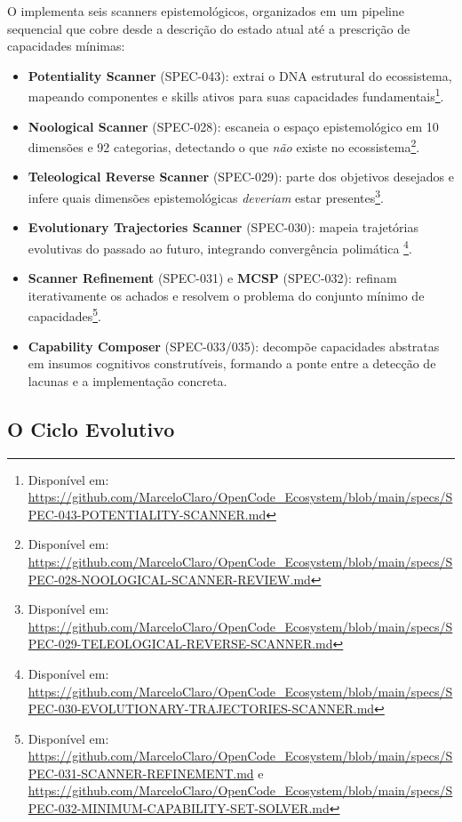 O \opencodeeco{} implementa seis scanners epistemológicos, organizados em um
pipeline sequencial que cobre desde a descrição do estado atual até a
prescrição de capacidades mínimas:

\begin{itemize}
\item \textbf{Potentiality Scanner} (SPEC-043): extrai o DNA estrutural do
ecossistema, mapeando componentes e skills ativos para suas capacidades
fundamentais\footnote{Disponível em:
\url{https://github.com/MarceloClaro/OpenCode_Ecosystem/blob/main/specs/SPEC-043-POTENTIALITY-SCANNER.md}}.
\item \textbf{Noological Scanner} (SPEC-028): escaneia o espaço epistemológico
em 10 dimensões e 92 categorias, detectando o que \emph{não} existe no
ecossistema\footnote{Disponível em:
\url{https://github.com/MarceloClaro/OpenCode_Ecosystem/blob/main/specs/SPEC-028-NOOLOGICAL-SCANNER-REVIEW.md}}.
\item \textbf{Teleological Reverse Scanner} (SPEC-029): parte dos objetivos
desejados e infere quais dimensões epistemológicas \emph{deveriam} estar
presentes\footnote{Disponível em:
\url{https://github.com/MarceloClaro/OpenCode_Ecosystem/blob/main/specs/SPEC-029-TELEOLOGICAL-REVERSE-SCANNER.md}}.
\item \textbf{Evolutionary Trajectories Scanner} (SPEC-030): mapeia trajetórias
evolutivas do passado ao futuro, integrando convergência polimática
\footnote{Disponível em:
\url{https://github.com/MarceloClaro/OpenCode_Ecosystem/blob/main/specs/SPEC-030-EVOLUTIONARY-TRAJECTORIES-SCANNER.md}}.
\item \textbf{Scanner Refinement} (SPEC-031) e \textbf{MCSP} (SPEC-032):
refinam iterativamente os achados e resolvem o problema do conjunto mínimo
de capacidades\footnote{Disponível em:
\url{https://github.com/MarceloClaro/OpenCode_Ecosystem/blob/main/specs/SPEC-031-SCANNER-REFINEMENT.md}
e
\url{https://github.com/MarceloClaro/OpenCode_Ecosystem/blob/main/specs/SPEC-032-MINIMUM-CAPABILITY-SET-SOLVER.md}}.
\item \textbf{Capability Composer} (SPEC-033/035): decompõe capacidades
abstratas em insumos cognitivos construtíveis, formando a ponte entre
a detecção de lacunas e a implementação concreta.
\end{itemize}

\subsection{O Ciclo Evolutivo}

